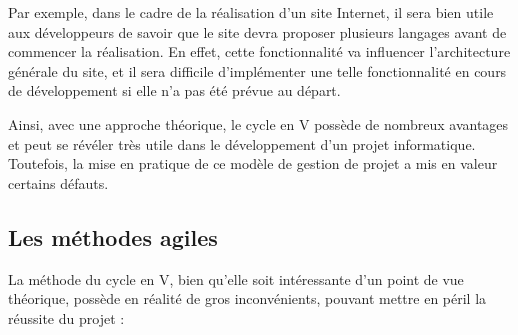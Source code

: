 Par exemple, dans le cadre de la réalisation d'un site Internet, il sera bien utile aux développeurs de savoir que le site devra proposer plusieurs langages avant de commencer la réalisation. En effet, cette fonctionnalité va influencer l'architecture générale du site, et il sera difficile d'implémenter une telle fonctionnalité en cours de développement si elle n'a pas été prévue au départ.

Ainsi, avec une approche théorique, le cycle en V possède de nombreux avantages et peut se révéler très utile dans le développement d'un projet informatique. Toutefois, la mise en pratique de ce modèle de gestion de projet a mis en valeur certains défauts.

\subsection{Les méthodes agiles}

La méthode du cycle en V, bien qu'elle soit intéressante d'un point de vue théorique, possède en réalité de gros inconvénients, pouvant mettre en péril la réussite du projet :

